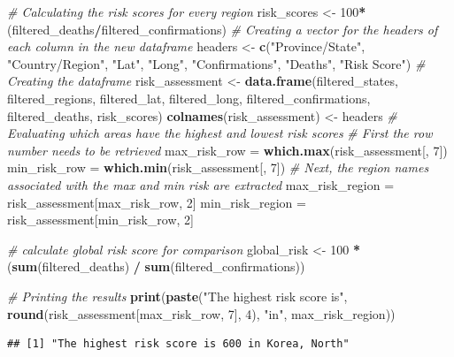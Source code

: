 \documentclass[
]{article}
\newenvironment{Shaded}{\begin{snugshade}}{\end{snugshade}}
\newcommand{\CommentTok}[1]{\textcolor[rgb]{0.56,0.35,0.01}{\textit{#1}}}
\newcommand{\DecValTok}[1]{\textcolor[rgb]{0.00,0.00,0.81}{#1}}
\newcommand{\FunctionTok}[1]{\textcolor[rgb]{0.13,0.29,0.53}{\textbf{#1}}}
\newcommand{\NormalTok}[1]{#1}
\newcommand{\OtherTok}[1]{\textcolor[rgb]{0.56,0.35,0.01}{#1}}
\newcommand{\SpecialCharTok}[1]{\textcolor[rgb]{0.81,0.36,0.00}{\textbf{#1}}}
\newcommand{\StringTok}[1]{\textcolor[rgb]{0.31,0.60,0.02}{#1}}
\begin{document}
\begin{Shaded}
\begin{Highlighting}[]
\CommentTok{\# Calculating the risk scores for every region}
\NormalTok{risk\_scores }\OtherTok{\textless{}{-}} \DecValTok{100}\SpecialCharTok{*}\NormalTok{(filtered\_deaths}\SpecialCharTok{/}\NormalTok{filtered\_confirmations)}
\CommentTok{\# Creating a vector for the headers of each column in the new dataframe}
\NormalTok{headers }\OtherTok{\textless{}{-}} \FunctionTok{c}\NormalTok{(}\StringTok{"Province/State"}\NormalTok{, }\StringTok{"Country/Region"}\NormalTok{, }\StringTok{"Lat"}\NormalTok{, }\StringTok{"Long"}\NormalTok{, }\StringTok{"Confirmations"}\NormalTok{, }\StringTok{"Deaths"}\NormalTok{, }\StringTok{"Risk Score"}\NormalTok{)}
\CommentTok{\# Creating the dataframe}
\NormalTok{risk\_assessment }\OtherTok{\textless{}{-}} \FunctionTok{data.frame}\NormalTok{(filtered\_states, filtered\_regions, filtered\_lat, filtered\_long, filtered\_confirmations, filtered\_deaths, risk\_scores)}
\FunctionTok{colnames}\NormalTok{(risk\_assessment) }\OtherTok{\textless{}{-}}\NormalTok{ headers}
\CommentTok{\# Evaluating which areas have the highest and lowest risk scores}
\CommentTok{\# First the row number needs to be retrieved}
\NormalTok{max\_risk\_row }\OtherTok{=} \FunctionTok{which.max}\NormalTok{(risk\_assessment[, }\DecValTok{7}\NormalTok{])}
\NormalTok{min\_risk\_row }\OtherTok{=} \FunctionTok{which.min}\NormalTok{(risk\_assessment[, }\DecValTok{7}\NormalTok{])}
\CommentTok{\# Next, the region names associated with the max and min risk are extracted}
\NormalTok{max\_risk\_region }\OtherTok{=}\NormalTok{ risk\_assessment[max\_risk\_row, }\DecValTok{2}\NormalTok{]}
\NormalTok{min\_risk\_region }\OtherTok{=}\NormalTok{ risk\_assessment[min\_risk\_row, }\DecValTok{2}\NormalTok{]}

\CommentTok{\# calculate global risk score for comparison}
\NormalTok{global\_risk }\OtherTok{\textless{}{-}} \DecValTok{100} \SpecialCharTok{*}\NormalTok{ (}\FunctionTok{sum}\NormalTok{(filtered\_deaths) }\SpecialCharTok{/} \FunctionTok{sum}\NormalTok{(filtered\_confirmations))}

\CommentTok{\# Printing the results}
\FunctionTok{print}\NormalTok{(}\FunctionTok{paste}\NormalTok{(}\StringTok{"The highest risk score is"}\NormalTok{, }\FunctionTok{round}\NormalTok{(risk\_assessment[max\_risk\_row, }\DecValTok{7}\NormalTok{], }\DecValTok{4}\NormalTok{), }\StringTok{"in"}\NormalTok{, max\_risk\_region))}
\end{Highlighting}
\end{Shaded}

\begin{verbatim}
## [1] "The highest risk score is 600 in Korea, North"
\end{verbatim}
\end{document}
